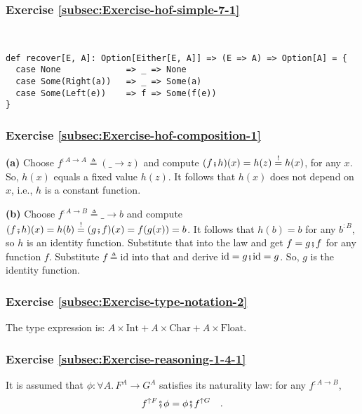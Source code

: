 \subsubsection*{Exercise \ref{subsec:Exercise-hof-simple-7-1}}

~
\begin{lstlisting}
def recover[E, A]: Option[Either[E, A]] => (E => A) => Option[A] = {
  case None             => _ => None
  case Some(Right(a))   => _ => Some(a)
  case Some(Left(e))    => f => Some(f(e))
}
\end{lstlisting}


\subsubsection*{Exercise \ref{subsec:Exercise-hof-composition-1}}

\textbf{(a)} Choose $f^{:A\rightarrow A}\triangleq(\_\rightarrow z)$
and compute $(f\bef h)(x)=h(z)\overset{!}{=}h(x)$, for any $x$.
So, $h(x)$ equals a fixed value $h(z)$. It follows that $h(x)$
does not depend on $x$, i.e., $h$ is a constant function.

\textbf{(b)} Choose $f^{:A\rightarrow B}\triangleq\_\rightarrow b$
and compute $(f\bef h)(x)=h(b)\overset{!}{=}(g\bef f)(x)=f(g(x))=b$.
It follows that $h(b)=b$ for any $b^{:B}$, so $h$ is an identity
function. Substitute that into the law and get $f=g\bef f$ for any
function $f$. Substitute $f\triangleq\text{id}$ into that and derive
$\text{id}=g\bef\text{id}=g$. So, $g$ is the identity function.


\subsubsection*{Exercise \ref{subsec:Exercise-type-notation-2}}

The type expression is: $A\times\text{Int}+A\times\text{Char}+A\times\text{Float}$.


\subsubsection*{Exercise \ref{subsec:Exercise-reasoning-1-4-1}}

It is assumed that $\phi:\forall A.\,F^{A}\rightarrow G^{A}$ satisfies
its naturality law: for any $f^{:A\rightarrow B}$,
\[
f^{\uparrow F}\bef\phi=\phi\bef f^{\uparrow G}\quad.
\]

